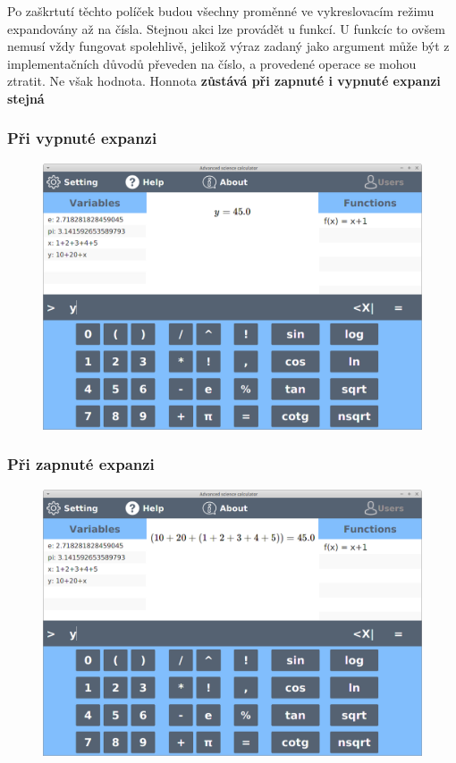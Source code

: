 \documentclass[11pt, a4paper, titlepage]{article}
\begin{document}
	Po zaškrtutí těchto políček budou všechny proměnné ve vykreslovacím režimu expandovány až na čísla.
	Stejnou akci lze provádět u funkcí. U funkcíc to ovšem nemusí vždy fungovat spolehlivě, jelikož
	výraz zadaný jako argument může být z implementačních důvodů převeden na číslo,
	a provedené operace se mohou ztratit. Ne však hodnota. Honnota 
	\textbf{zůstává při zapnuté i vypnuté expanzi stejná}

	\subsubsection{Při vypnuté expanzi}
	
	\begin{figure}[h!]
	    \centering
	    \includegraphics[scale=0.25]{./assets/expof.png}
	\end{figure}

	\subsubsection{Při zapnuté expanzi}

	\begin{figure}[h!]
	    \centering
	    \includegraphics[scale=0.25]{./assets/expon.png}
	\end{figure}
\end{document}
